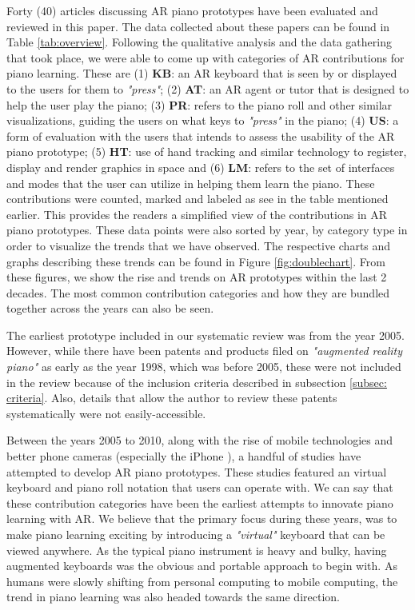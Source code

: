 \documentclass[manuscript,screen]{acmart}
\begin{document}
Forty (40) articles discussing AR piano prototypes have been evaluated and reviewed in this paper. The data collected about these papers can be found in Table \ref{tab:overview}. Following the qualitative analysis and the data gathering that took place, we were able to come up with categories of AR contributions for piano learning. These are (1) \textbf{KB}: an AR keyboard that is seen by or displayed to the users for them to \textit{"press"}; (2) \textbf{AT}: an AR agent or tutor that is designed to help the user play the piano; (3) \textbf{PR}: refers to the piano roll and other similar visualizations, guiding the users on what keys to  \textit{"press"} in the piano; (4) \textbf{US}: a form of evaluation with the users that intends to assess the usability of the AR piano prototype; (5) \textbf{HT}: use of hand tracking and similar technology to register, display and render graphics in space and (6) \textbf{LM}: refers to the set of interfaces and modes that the user can utilize in helping them learn the piano. These contributions were counted, marked and labeled as see in the table mentioned earlier. This provides the readers a simplified view of the contributions in AR piano prototypes. These data points were also sorted by year, by category type in order to visualize the trends that we have observed. The respective charts and graphs describing these trends can be found in Figure \ref{fig:doublechart}. From these figures, we show the rise and trends on AR prototypes within the last 2 decades. The most common contribution categories and how they are bundled together across the years can also be seen. 

The earliest prototype included in our systematic review was from the year 2005. However, while there have been patents and products filed on \textit{"augmented reality piano"} as early as the year 1998, which was before 2005, these were not included in the review because of the inclusion criteria described in subsection \ref{subsec: criteria}. Also, details that allow the author to review these patents systematically were not easily-accessible.

Between the years 2005 to 2010, along with the rise of mobile technologies and better phone cameras (especially the iPhone \cite{querashi2012apple}), a handful of studies have attempted to develop AR piano prototypes. These studies featured an virtual keyboard and piano roll notation that users can operate with. We can say that these contribution categories have been the earliest attempts to innovate piano learning with AR. We believe that the primary focus during these years, was to make piano learning exciting by introducing a \textit{"virtual"} keyboard that can be viewed anywhere. As the typical piano instrument is heavy and bulky, having augmented keyboards was the obvious and portable approach to begin with. As humans were slowly shifting from personal computing to mobile computing, the trend in piano learning was also headed towards the same direction.
\end{document}
